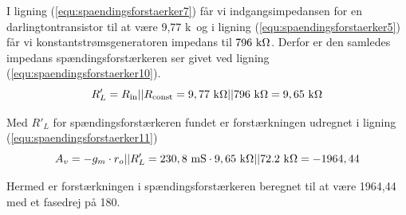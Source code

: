 I ligning (\ref{equ:spaendingsforstaerker7}) får vi indgangsimpedansen for en darlingtontransistor til at være 9,77 k\ohm~og i ligning (\ref{equ:spaendingsforstaerker5}) får vi konstantstrømsgeneratoren impedans til $796~\mathrm{k}\ohm$. Derfor er den samledes impedans spændingsforstærkeren ser givet ved ligning (\ref{equ:spaendingsforstaerker10}).
\begin{equation}
\label{equ:spaendingsforstaerker10}
R'_L = R_{\mathrm{in}}||R_{\mathrm{const}} = 9,77~\mathrm{k}\ohm || 796~\mathrm{k}\ohm = 9,65~\mathrm{k}\ohm
\end{equation}  

Med $R'_L$ for spændingsforstærkeren fundet er forstærkningen udregnet i ligning (\ref{equ:spaendingsforstaerker11})
\begin{equation}
\label{equ:spaendingsforstaerker11}
A_v = -g_m \cdot r_o || R'_L = 230,8~\mathrm{mS} \cdot 9,65~\mathrm{k}\ohm || 72.2~\mathrm{k}\ohm = -1964,44
\end{equation}

Hermed er forstærkningen i spændingsforstærkeren beregnet til at være 1964,44 med et fasedrej på 180\degree .
